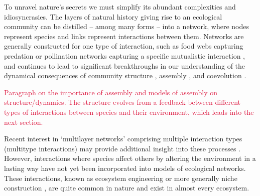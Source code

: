 \documentclass[twocolumn,preprintnumbers,amsmath,amssymb,superscriptaddress,linenumbers]{revtex4-1}
\newcommand{\rev}[1]{\textcolor{crimson}{#1}}
\begin{document}
\maketitle





To unravel nature's secrets we must simplify its abundant complexities and idiosyncrasies.
The layers of natural history giving rise to an ecological community can be distilled -- among many forms -- into a network, where nodes represent species and links represent interactions between them.
Networks are generally constructed for one type of interaction, such as food webs capturing predation \cite{Paine1966,Dunne2002,Pascual2006} or pollination networks capturing a specific mutualistic interaction \cite{Bascompte2013}, and continues to lead to significant breakthroughs in our understanding of the dynamical consequences of community structure \cite{May1972,Gross2009,Allesina2012}, assembly \cite{Ponisio2017}, and coevolution \cite{Guimaraes2017}. 

\rev{Paragraph on the importance of assembly and models of assembly on structure/dynamics.
The structure evolves from a feedback between different types of interactions between species and their environment, which leads into the next section.}

Recent interest in `multilayer networks' comprising multiple interaction types (multitype interactions) may provide additional insight into these processes \cite{Kefi2016,Pilosof2017}. 
However, interactions where species affect others by altering the environment in a lasting way have not yet been incorporated into models of ecological networks. 
These interactions, known as ecosystem engineering \cite{Lawton1994,OdlingSmee2013} or more generally niche construction \cite{OdlingSmee2013b,Fukami2015}, are quite common in nature and exist in almost every ecosystem.
\end{document}
